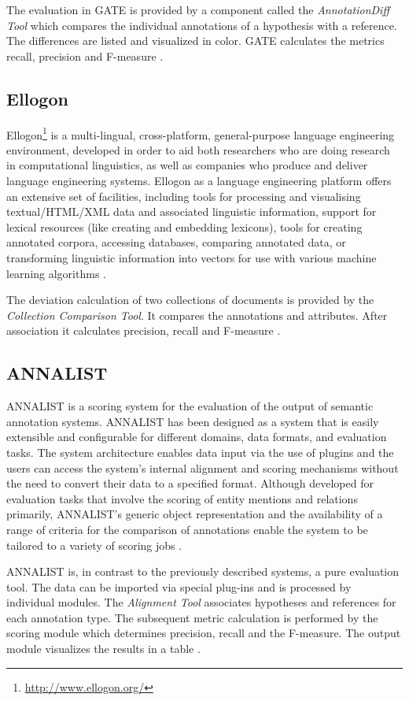 The evaluation in \gls{GATE} is provided by a component called the \textit{AnnotationDiff Tool} which compares the individual annotations of a hypothesis with a reference. The differences are listed and visualized in color. \gls{GATE} calculates the metrics recall, precision and F-measure \cite{Linsmayr:2010}.

\subsection{Ellogon}
Ellogon\footnote{\url{http://www.ellogon.org/}} is a multi-lingual, cross-platform, general-purpose language engineering environment, developed in order to aid both researchers who are doing research in computational linguistics, as well as companies who produce and deliver language engineering systems. Ellogon as a language engineering platform offers an extensive set of facilities, including tools for processing and visualising textual/HTML/XML data and associated linguistic information, support for lexical resources (like creating and embedding lexicons), tools for creating annotated corpora, accessing databases, comparing annotated data, or transforming linguistic information into vectors for use with various machine learning algorithms \cite{Ellogon}.

The deviation calculation of two collections of documents is provided by the \textit{Collection Comparison Tool}. It compares the annotations and attributes. After association it calculates precision, recall and F-measure \cite{Linsmayr:2010}.

\subsection{ANNALIST}
\gls{ANNALIST} is a scoring system for the evaluation of the output of semantic annotation systems. \gls{ANNALIST} has been designed as a system that is easily extensible and configurable for different domains, data formats, and evaluation tasks. The system architecture enables data input via the use of plugins and the users can access the system’s internal alignment and scoring mechanisms without the need to convert their data to a specified format. Although developed for evaluation tasks that involve the scoring of entity mentions and relations primarily, \gls{ANNALIST}'s generic object representation and the availability of a range of criteria for the comparison of annotations enable the system to be tailored to a variety of scoring jobs \cite{Demetriou:2008}.

\gls{ANNALIST} is, in contrast to the previously described systems, a pure evaluation tool. The data can be imported via special plug-ins and is processed by individual modules. The \textit{Alignment Tool} associates hypotheses and references for each annotation type. The subsequent metric calculation is performed by the scoring module which determines precision, recall and the F-measure. The output module visualizes the results in a table \cite{Linsmayr:2010}.